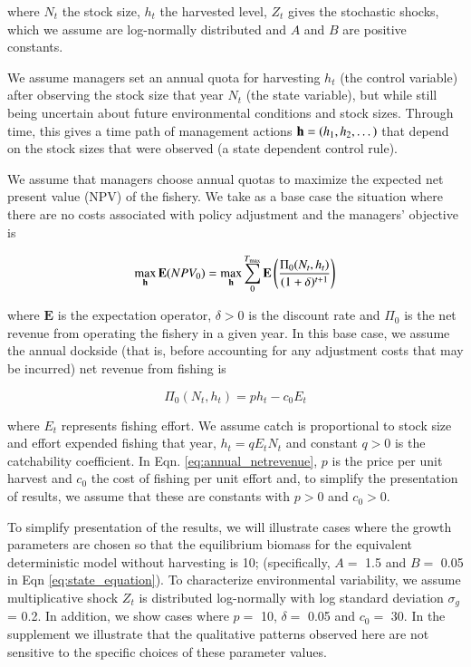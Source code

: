 \documentclass[review,12pt,author-year,titlepage]{components/elsarticle} %
\begin{document}
\begin{flushleft}
where \(N_t\) the stock size, \(h_t\) the harvested level, \(Z_t\) gives
the stochastic shocks, which we assume are log-normally distributed and
\(A\) and \(B\) are positive constants.

We assume managers set an annual quota for harvesting \(h_t\) (the
control variable) after observing the stock size that year \(N_t\) (the
state variable), but while still being uncertain about future
environmental conditions and stock sizes. Through time, this gives a
time path of management actions \({\bf h}=(h_1,h_2,\dots)\) that depend
on the stock sizes that were observed (a state dependent control rule).

We assume that managers choose annual quotas to maximize the expected
net present value (NPV) of the fishery. We take as a base case the
situation where there are no costs associated with policy adjustment and
the managers' objective is

\begin{equation}
\max_{{\bf h}}\mathbf{ E} ( NPV_{0} )=\max_{{\bf h}} \sum_0^{T_{\mathrm{max}}} 
\mathbf{E} \left( \displaystyle \frac{\Pi_0(N_t,h_t)}{(1+\delta)^{t+1}} \right) \label{eq:objective}
\end{equation}

where \(\mathbf{E}\) is the expectation operator, \(\delta>0\) is the
discount rate and \(\Pi_0\) is the net revenue from operating the
fishery in a given year. In this base case, we assume the annual
dockside (that is, before accounting for any adjustment costs that may
be incurred) net revenue from fishing is

\begin{equation}
\Pi_0(N_t,h_t) = p h_t -  c_0 E_t \label{eq:annual_netrevenue}
\end{equation}

where \(E_t\) represents fishing effort. We assume catch is proportional
to stock size and effort expended fishing that year, \(h_t = q E_t N_t\)
and constant \(q>0\) is the catchability coefficient. In Eqn.
\eqref{eq:annual_netrevenue}, \(p\) is the price per unit harvest and
\(c_0\) the cost of fishing per unit effort and, to simplify the
presentation of results, we assume that these are constants with \(p>0\)
and \(c_0>0\).

To simplify presentation of the results, we will illustrate cases where
the growth parameters are chosen so that the equilibrium biomass for the
equivalent deterministic model without harvesting is 10; (specifically,
\(A=\) 1.5 and \(B=\) 0.05 in Eqn \eqref{eq:state_equation}). To
characterize environmental variability, we assume multiplicative shock
\(Z_t\) is distributed log-normally with log standard deviation
\(\sigma_g\) = 0.2. In addition, we show cases where \(p=\) 10,
\(\delta=\) 0.05 and \(c_0=\) 30. In the supplement we illustrate that
the qualitative patterns observed here are not sensitive to the specific
choices of these parameter values.


\end{flushleft}
\end{document}
